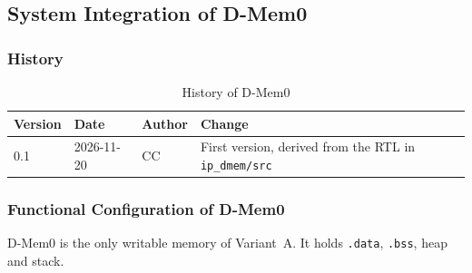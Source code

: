
\subsection{System Integration of D-Mem0}

\subsubsection{History}

\begin{table}[H]
\caption{History of D-Mem0}
\label{tab:asDmemHist01}
\centering
\begin{tabularx}{\textwidth}{|l |l |l |X|}
  \hline
  Version & Date & Author & Change \\
  \hline
  \hline
  0.1 & 2026-11-20 & CC & First version, derived from the RTL in \texttt{ip\_dmem/src} \\
  \hline
\end{tabularx}
\end{table}

\subsubsection{Functional Configuration of D-Mem0}

D-Mem0 is the only writable memory of Variant~A. It holds \texttt{.data},
\texttt{.bss}, heap and stack.

